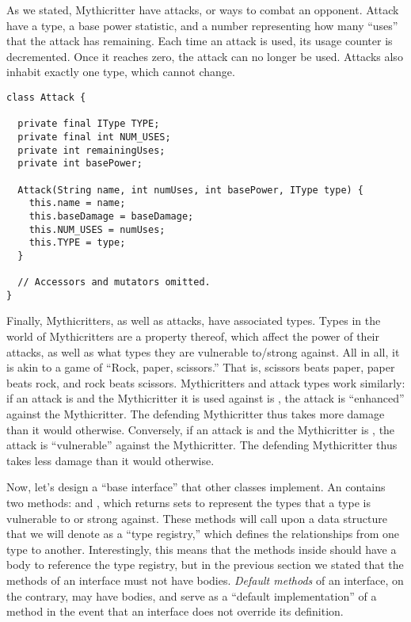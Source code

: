As we stated, Mythicritter have attacks, or ways to combat an opponent. 
Attack have a type, a base power statistic, and a number representing how many ``uses'' that the attack has remaining. 
Each time an attack is used, its usage counter is decremented. 
Once it reaches zero, the attack can no longer be used. Attacks also inhabit exactly one type, which cannot change.

\begin{lstlisting}[language=MyJava]
class Attack {

  private final IType TYPE;
  private final int NUM_USES;
  private int remainingUses;
  private int basePower;

  Attack(String name, int numUses, int basePower, IType type) {
    this.name = name;
    this.baseDamage = baseDamage;
    this.NUM_USES = numUses;
    this.TYPE = type;
  }

  // Accessors and mutators omitted.
}
\end{lstlisting}

Finally, Mythicritters, as well as attacks, have associated types. 
Types in the world of Mythicritters are a property thereof, which affect the power of their attacks, as well as what types they are vulnerable to/strong against. 
All in all, it is akin to a game of ``Rock, paper, scissors.'' 
That is, scissors beats paper, paper beats rock, and rock beats scissors. Mythicritters and attack types work similarly: if an attack is  and the Mythicritter it is used against is , the attack is ``enhanced'' against the Mythicritter. 
The defending Mythicritter thus takes more damage than it would otherwise. 
Conversely, if an attack is  and the Mythicritter is , the attack is ``vulnerable'' against the Mythicritter. 
The defending Mythicritter thus takes less damage than it would otherwise. 

Now, let's design a ``base interface'' that other classes implement. 
An  contains two methods:  and , which returns sets to represent the types that a type is vulnerable to or strong against. 
These methods will call upon a data structure that we will denote as a ``type registry,'' which defines the relationships from one type to another. 
Interestingly, this means that the methods inside  should have a body to reference the type registry, but in the previous section we stated that the methods of an interface must not have bodies. 
\emph{Default methods} of an interface, on the contrary, may have bodies, and serve as a ``default implementation'' of a method in the event that an interface does not override its definition.

